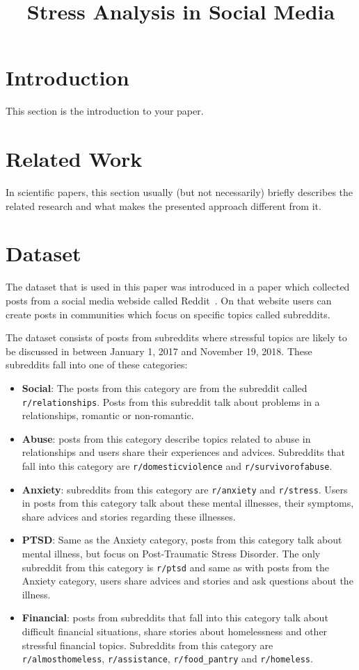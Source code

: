 \documentclass[10pt, a4paper]{article}
\title{Stress Analysis in Social Media}
\begin{document}
\maketitleabstract

\section{Introduction}

This section is the introduction to your paper.

\section{Related Work}

In scientific papers, this section usually (but not necessarily) briefly describes the related research and what makes the presented approach different from it.

\section{Dataset}

The dataset that is used in this paper was introduced in a paper which collected posts from a social media webside called Reddit~\citep{turcan-mckeown-2019-dreaddit}.
On that website users can create posts in communities which focus on specific topics called subreddits.

The dataset consists of posts from subreddits where stressful topics are likely to be discussed in between January 1, 2017 and November 19, 2018.
These subreddits fall into one of these categories:

\begin{itemize}
    \item \textbf{Social}: The posts from this category are from the subreddit called \verb|r/relationships|.
        Posts from this subreddit talk about problems in a relationships, romantic or non-romantic.
    \item \textbf{Abuse}: posts from this category describe topics related to abuse in relationships and users share their experiences and advices.
        Subreddits that fall into this category are \verb|r/domesticviolence| and \verb|r/survivorofabuse|.
    \item \textbf{Anxiety}: subreddits from this category are \verb|r/anxiety| and \verb|r/stress|.
        Users in posts from this category talk about these mental illnesses, their symptoms, share advices and stories regarding these illnesses.
    \item \textbf{PTSD}: Same as the Anxiety category, posts from this category talk about mental illness, but focus on Post-Traumatic Stress Disorder.
        The only subreddit from this category is \verb|r/ptsd| and same as with posts from the Anxiety category, users share advices and stories and ask questions about the illness.
    \item \textbf{Financial}: posts from subreddits that fall into this category talk about difficult financial situations, share stories about homelessness and other stressful financial topics.
        Subreddits from this category are \verb|r/almosthomeless|, \verb|r/assistance|, \verb|r/food_pantry| and \verb|r/homeless|.
\end{itemize}
\end{document}
